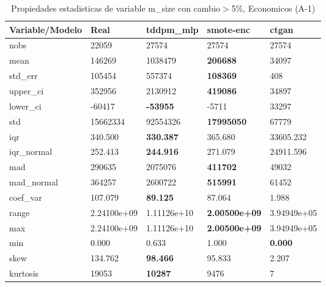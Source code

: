 \begin{table}[H]
\centering
\fontsize{8}{14}\selectfont
\caption{Propiedades estadisticas de variable m\_size con cambio\ensuremath{>}5\%, Economicos (A-1)}
\label{table-stats-economicos-a-1-m_size-short}
\begin{tabular}{|l|m{10em}|m{10em}|m{10em}|m{10em}|}
\hline
 \rowcolor[gray]{0.8}
Variable/Modelo & Real & tddpm\_mlp & smote-enc & ctgan \\
\hline nobs & 22059 & 27574 & 27574 & 27574 \\
\hline mean & 146269 & \cellcolor[rgb]{0.9, 0.54, 0.52} 1038479 & \bfseries 206688 & 34097 \\
\hline std\_err & 105454 & \cellcolor[rgb]{0.9, 0.54, 0.52} 557374 & \bfseries 108369 & 408 \\
\hline upper\_ci & 352956 & \cellcolor[rgb]{0.9, 0.54, 0.52} 2130912 & \bfseries 419086 & 34897 \\
\hline lower\_ci & -60417 & \bfseries -53955 & -5711 & \cellcolor[rgb]{0.9, 0.54, 0.52} 33297 \\
\hline std & 15662334 & \cellcolor[rgb]{0.9, 0.54, 0.52} 92554326 & \bfseries 17995050 & 67779 \\
\hline iqr & 340.500 & \bfseries 330.387 & 365.680 & \cellcolor[rgb]{0.9, 0.54, 0.52} 33605.232 \\
\hline iqr\_normal & 252.413 & \bfseries 244.916 & 271.079 & \cellcolor[rgb]{0.9, 0.54, 0.52} 24911.596 \\
\hline mad & 290635 & \cellcolor[rgb]{0.9, 0.54, 0.52} 2075076 & \bfseries 411702 & 49032 \\
\hline mad\_normal & 364257 & \cellcolor[rgb]{0.9, 0.54, 0.52} 2600722 & \bfseries 515991 & 61452 \\
\hline coef\_var & 107.079 & \bfseries 89.125 & 87.064 & \cellcolor[rgb]{0.9, 0.54, 0.52} 1.988 \\
\hline range & 2.24100e+09 & \cellcolor[rgb]{0.9, 0.54, 0.52} 1.11126e+10 & \bfseries 2.00500e+09 & 3.94949e+05 \\
\hline max & 2.24100e+09 & \cellcolor[rgb]{0.9, 0.54, 0.52} 1.11126e+10 & \bfseries 2.00500e+09 & 3.94949e+05 \\
\hline min & 0.000 & 0.633 & \cellcolor[rgb]{0.9, 0.54, 0.52} 1.000 & \bfseries 0.000 \\
\hline skew & 134.762 & \bfseries 98.466 & 95.833 & \cellcolor[rgb]{0.9, 0.54, 0.52} 2.207 \\
\hline kurtosis & 19053 & \bfseries 10287 & 9476 & \cellcolor[rgb]{0.9, 0.54, 0.52} 7 \\

\end{tabular}
\end{table}
